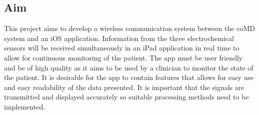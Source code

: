 \subsection{Aim}
This project aims to develop a wireless communication system between the coMD system and an iOS application. Information from the three electrochemical sensors will be received simultaneously in an iPad application in real time to allow for continuous monitoring of the patient. The app must be user friendly and be of high quality as it aims to be used by a clinician to monitor the state of the patient. It is desirable for the app to contain features that allows for easy use and easy readability of the data presented. It is important that the signals are transmitted and displayed accurately so suitable processing methods need to be implemented. 

